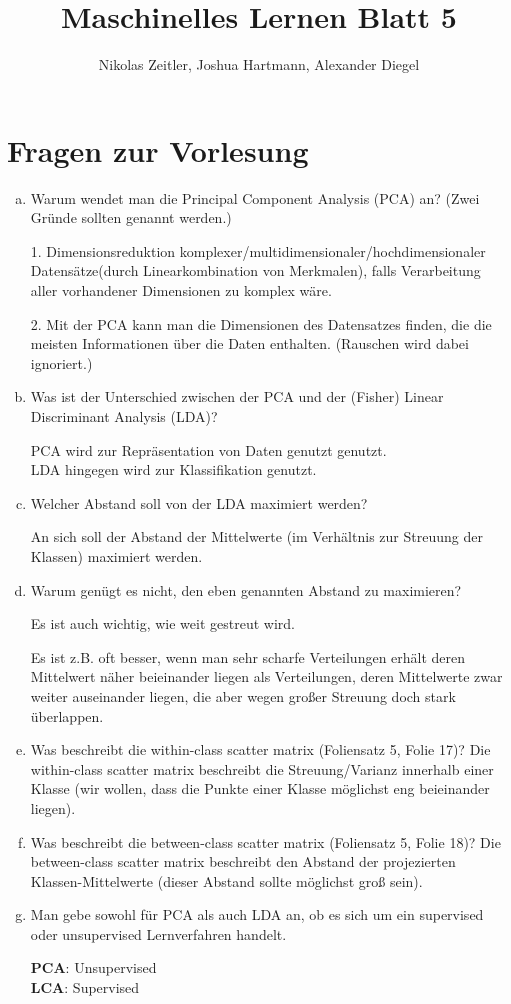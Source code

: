\documentclass[a4paper]{scrartcl}
\author{Nikolas Zeitler, Joshua Hartmann, Alexander Diegel}
\title{Maschinelles Lernen Blatt 5}
\begin{document}
\maketitle
\section{Fragen zur Vorlesung}

\begin{enumerate}[a)]
	\item Warum wendet man die Principal Component Analysis (PCA) an? (Zwei Gründe sollten genannt werden.)
	
	1. Dimensionsreduktion komplexer/multidimensionaler/hochdimensionaler Datensätze(durch Linearkombination von Merkmalen), falls Verarbeitung aller vorhandener Dimensionen zu komplex wäre.
	
	2. Mit der PCA kann man die Dimensionen des Datensatzes finden, die die meisten Informationen über die Daten enthalten. (Rauschen wird dabei ignoriert.)
	
	\item Was ist der Unterschied zwischen der PCA und der (Fisher) Linear Discriminant Analysis (LDA)?
	
	PCA wird zur Repräsentation von Daten genutzt genutzt.\\
	LDA hingegen wird zur Klassifikation genutzt.
	
	\item Welcher Abstand soll von der LDA maximiert werden?
	
	An sich soll der Abstand der Mittelwerte (im Verhältnis zur Streuung der Klassen) maximiert werden.
	
	\item Warum genügt es nicht, den eben genannten Abstand zu maximieren?
	
	Es ist auch wichtig, wie weit gestreut wird.
	
	Es ist z.B.  oft besser, wenn man sehr scharfe Verteilungen erhält deren Mittelwert näher beieinander liegen als Verteilungen, deren Mittelwerte zwar weiter auseinander liegen, die aber wegen großer Streuung doch stark überlappen.
	
	\item Was beschreibt die within-class scatter matrix (Foliensatz 5, Folie 17)?
	Die within-class scatter matrix beschreibt die Streuung/Varianz innerhalb einer Klasse (wir wollen, dass die Punkte einer Klasse möglichst eng beieinander liegen).
	
	\item Was beschreibt die between-class scatter matrix (Foliensatz 5, Folie 18)?
	Die between-class scatter matrix beschreibt den Abstand der projezierten Klassen-Mittelwerte (dieser Abstand sollte möglichst groß sein).
	
	\item Man gebe sowohl für PCA als auch LDA an, ob es sich um ein supervised oder unsupervised Lernverfahren
	handelt.
	
	\textbf{PCA}: Unsupervised\\
	\textbf{LCA}: Supervised
	
\end{enumerate}
\end{document}
